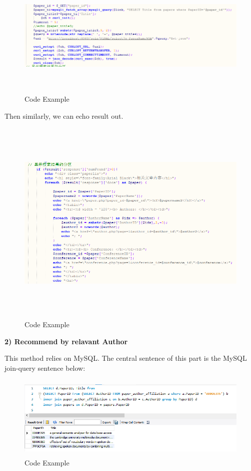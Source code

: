 \documentclass{book}
\begin{document}
\begin{figure}[H]
\centering
\includegraphics[height=6.0cm,width=16.0cm]{img/yhb_re_11.png}
\caption{Code Example}
\end{figure}

Then similarly, we can echo result out.
\begin{figure}[H]
\centering
\includegraphics[height=10.0cm,width=18.0cm]{img/yhb_re_12.png}
\caption{Code Example}
\end{figure}

\textbf{2) Recommend by relavant Author}

This method relies on MySQL. The central sentence of this part is the MySQL join-query sentence below:
\begin{figure}[H]
\centering
\includegraphics[height=4.0cm,width=13.0cm]{img/yhb_mp_4.png}
\caption{Code Example}
\end{figure}
\end{document}

